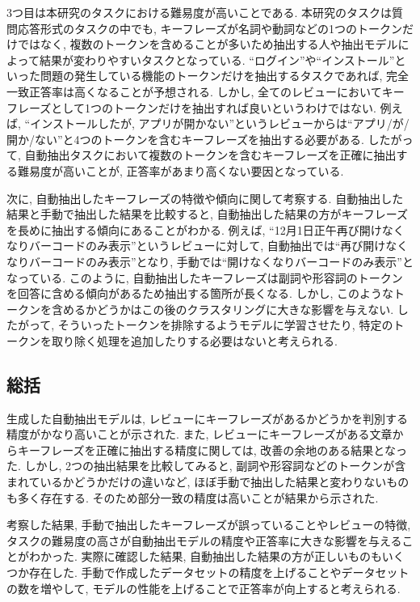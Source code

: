 3つ目は本研究のタスクにおける難易度が高いことである. 本研究のタスクは質問応答形式のタスクの中でも, キーフレーズが名詞や動詞などの1つのトークンだけではなく, 複数のトークンを含めることが多いため抽出する人や抽出モデルによって結果が変わりやすいタスクとなっている. 
``ログイン''や``インストール''といった問題の発生している機能のトークンだけを抽出するタスクであれば, 完全一致正答率は高くなることが予想される. しかし, 全てのレビューにおいてキーフレーズとして1つのトークンだけを抽出すれば良いというわけではない. 
例えば, ``インストールしたが, アプリが開かない''というレビューからは``アプリ/が/開か/ない''と4つのトークンを含むキーフレーズを抽出する必要がある. 
したがって, 自動抽出タスクにおいて複数のトークンを含むキーフレーズを正確に抽出する難易度が高いことが, 正答率があまり高くない要因となっている. 

次に, 自動抽出したキーフレーズの特徴や傾向に関して考察する. 
自動抽出した結果と手動で抽出した結果を比較すると, 自動抽出した結果の方がキーフレーズを長めに抽出する傾向にあることがわかる. 
例えば, ``12月1日正午再び開けなくなりバーコードのみ表示''というレビューに対して, 自動抽出では``再び開けなくなりバーコードのみ表示''となり, 手動では``開けなくなりバーコードのみ表示''となっている. 
このように, 自動抽出したキーフレーズは副詞や形容詞のトークンを回答に含める傾向があるため抽出する箇所が長くなる. しかし, このようなトークンを含めるかどうかはこの後のクラスタリングに大きな影響を与えない. したがって, そういったトークンを排除するようモデルに学習させたり, 特定のトークンを取り除く処理を追加したりする必要はないと考えられる. 


\subsection{総括}
生成した自動抽出モデルは, レビューにキーフレーズがあるかどうかを判別する精度がかなり高いことが示された. 
また, レビューにキーフレーズがある文章からキーフレーズを正確に抽出する精度に関しては, 改善の余地のある結果となった. しかし, 2つの抽出結果を比較してみると, 副詞や形容詞などのトークンが含まれているかどうかだけの違いなど, ほぼ手動で抽出した結果と変わりないものも多く存在する. そのため部分一致の精度は高いことが結果から示された. 

考察した結果, 手動で抽出したキーフレーズが誤っていることやレビューの特徴, タスクの難易度の高さが自動抽出モデルの精度や正答率に大きな影響を与えることがわかった. 実際に確認した結果, 自動抽出した結果の方が正しいものもいくつか存在した. 
手動で作成したデータセットの精度を上げることやデータセットの数を増やして, モデルの性能を上げることで正答率が向上すると考えられる. 

